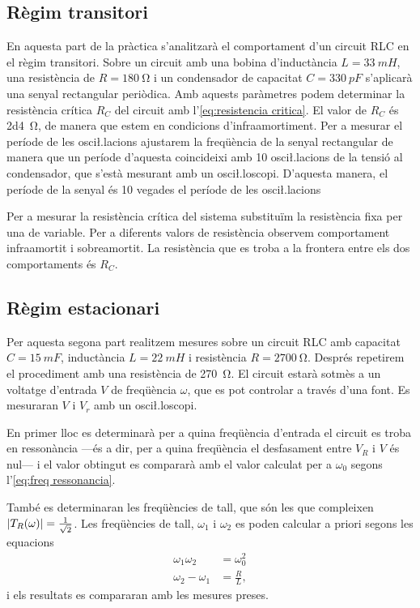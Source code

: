 \subsection{Règim transitori}
En aquesta part de la pràctica s'analitzarà el comportament d'un circuit RLC en el règim transitori. Sobre un circuit amb una bobina d'inductància \( L = \SI{33}{mH} \), una resistència de \( R = \SI{180}{\ohm} \) i un condensador de capacitat \( C  = \SI{330}{pF} \) s'aplicarà una senyal rectangular periòdica. Amb aquests paràmetres podem determinar la resistència crítica \( R_C \) del circuit amb l'\cref{eq:resistencia critica}. El valor de \( R_C \) és \SI{2d4}{\ohm}, de manera que estem en condicions d'infraamortiment. Per a mesurar el període de les osci\l.lacions ajustarem la freqüència de la senyal rectangular de manera que un període d'aquesta coincideixi amb 10 osci\l.lacions de la tensió al condensador, que s'està mesurant amb un osci\l.loscopi. D'aquesta manera, el període de la senyal és 10 vegades el període de les osci\l.lacions

Per a mesurar la resistència crítica del sistema substituïm la resistència fixa per una de variable. Per a diferents valors de resistència observem comportament infraamortit i sobreamortit. La resistència que es troba a la frontera entre els dos comportaments és \( R_C \).  

\subsection{Règim estacionari}
Per aquesta segona part realitzem mesures sobre un circuit RLC amb capacitat \( C = \SI{15}{mF} \), inductància \( L = \SI{22}{mH} \) i resistència \( R = \SI{2700}{\ohm} \). Després repetirem el procediment amb una resistència de \SI{270}{\ohm}. El circuit estarà sotmès a un voltatge d'entrada \( V \) de freqüència \( \omega \), que es pot controlar a través d'una font. Es mesuraran \( V \) i \( V_r \) amb un osci\l.loscopi.  

En primer lloc es determinarà per a quina freqüència d'entrada el circuit es troba en ressonància ---és a dir, per a quina freqüència el desfasament entre \( V_R \) i \( V \) és nul--- i el valor obtingut es compararà amb el valor calculat per a \( \omega_0 \) segons l'\cref{eq:freq ressonancia}. 

També es determinaran les freqüències de tall, que són les que compleixen \( \left\lvert T_R(\omega) \right\rvert = \frac{1}{\sqrt{2}} \). Les freqüències de tall, \( \omega_1 \) i \( \omega_2 \) es poden calcular a priori segons les equacions
\begin{equation} \label{eq:freqs de tall}
	\begin{aligned}
		\omega_1\omega_2 &= \omega_0^2 \\
		\omega_2 - \omega_1 &= \frac{R}{L},
	\end{aligned}
\end{equation}
i els resultats es compararan amb les mesures preses. 

